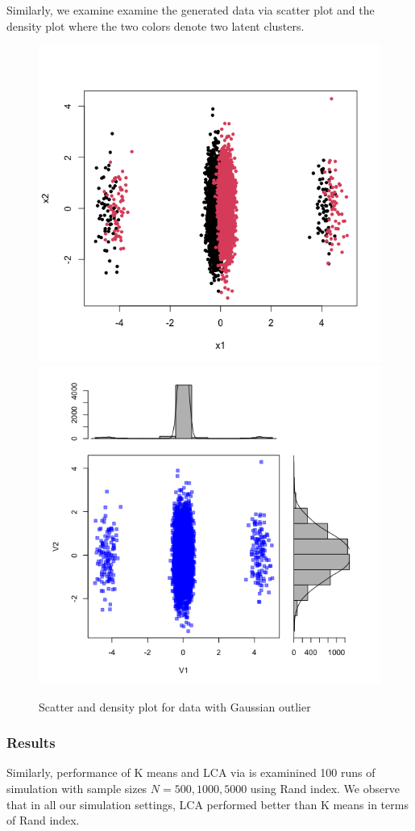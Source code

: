 \documentclass[
]{article}
\begin{document}
Similarly, we examine examine the generated data via scatter plot and
the density plot where the two colors denote two latent clusters.

\begin{figure}

{\centering \includegraphics[width=0.49\linewidth]{report_image/outlier} \includegraphics[width=0.49\linewidth]{report_image/outlier2} 

}

\caption{Scatter and density plot for data with Gaussian outlier}\label{fig:unnamed-chunk-4}
\end{figure}

\hypertarget{results-3}{%
\subsubsection{Results}\label{results-3}}

Similarly, performance of K means and LCA via is examinined 100 runs of
simulation with sample sizes \(N = 500, 1000, 5000\) using Rand index.
We observe that in all our simulation settings, LCA performed better
than K means in terms of Rand index.
\end{document}
